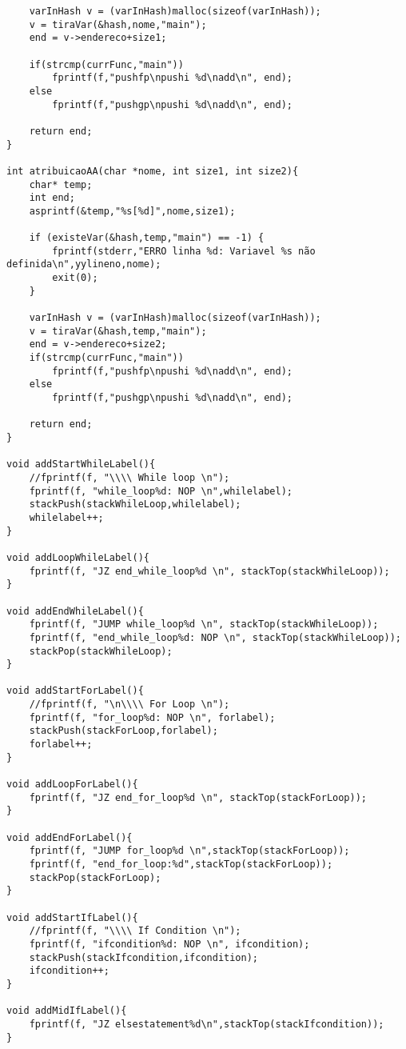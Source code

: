 \documentclass{report}
\begin{document}
\begin{verbatim}
	varInHash v = (varInHash)malloc(sizeof(varInHash));
	v = tiraVar(&hash,nome,"main");
	end = v->endereco+size1;

	if(strcmp(currFunc,"main"))
		fprintf(f,"pushfp\npushi %d\nadd\n", end);
	else 
		fprintf(f,"pushgp\npushi %d\nadd\n", end);

	return end;
}

int atribuicaoAA(char *nome, int size1, int size2){
	char* temp;
	int end;
	asprintf(&temp,"%s[%d]",nome,size1);

	if (existeVar(&hash,temp,"main") == -1) {
		fprintf(stderr,"ERRO linha %d: Variavel %s não definida\n",yylineno,nome);
		exit(0);
	}

	varInHash v = (varInHash)malloc(sizeof(varInHash));
	v = tiraVar(&hash,temp,"main");
	end = v->endereco+size2;
	if(strcmp(currFunc,"main"))
		fprintf(f,"pushfp\npushi %d\nadd\n", end);
	else
		fprintf(f,"pushgp\npushi %d\nadd\n", end);
	
	return end;
}

void addStartWhileLabel(){
	//fprintf(f, "\\\\ While loop \n");
	fprintf(f, "while_loop%d: NOP \n",whilelabel);
	stackPush(stackWhileLoop,whilelabel);
	whilelabel++;
}

void addLoopWhileLabel(){
	fprintf(f, "JZ end_while_loop%d \n", stackTop(stackWhileLoop));
}

void addEndWhileLabel(){
	fprintf(f, "JUMP while_loop%d \n", stackTop(stackWhileLoop));
	fprintf(f, "end_while_loop%d: NOP \n", stackTop(stackWhileLoop));
	stackPop(stackWhileLoop);
}

void addStartForLabel(){
	//fprintf(f, "\n\\\\ For Loop \n");
	fprintf(f, "for_loop%d: NOP \n", forlabel);
	stackPush(stackForLoop,forlabel);
	forlabel++;
}

void addLoopForLabel(){
	fprintf(f, "JZ end_for_loop%d \n", stackTop(stackForLoop));
}

void addEndForLabel(){
	fprintf(f, "JUMP for_loop%d \n",stackTop(stackForLoop));
	fprintf(f, "end_for_loop:%d",stackTop(stackForLoop));
	stackPop(stackForLoop);
}

void addStartIfLabel(){
	//fprintf(f, "\\\\ If Condition \n");
	fprintf(f, "ifcondition%d: NOP \n", ifcondition);
	stackPush(stackIfcondition,ifcondition);
	ifcondition++;
}

void addMidIfLabel(){
	fprintf(f, "JZ elsestatement%d\n",stackTop(stackIfcondition));
}


\end{verbatim}
\end{document}
